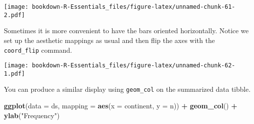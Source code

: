 \documentclass[
]{book}
\newenvironment{Shaded}{\begin{snugshade}}{\end{snugshade}}
\newcommand{\CommentTok}[1]{\textcolor[rgb]{0.56,0.35,0.01}{\textit{#1}}}
\newcommand{\DataTypeTok}[1]{\textcolor[rgb]{0.13,0.29,0.53}{#1}}
\newcommand{\DecValTok}[1]{\textcolor[rgb]{0.00,0.00,0.81}{#1}}
\newcommand{\KeywordTok}[1]{\textcolor[rgb]{0.13,0.29,0.53}{\textbf{#1}}}
\newcommand{\NormalTok}[1]{#1}
\newcommand{\OperatorTok}[1]{\textcolor[rgb]{0.81,0.36,0.00}{\textbf{#1}}}
\newcommand{\StringTok}[1]{\textcolor[rgb]{0.31,0.60,0.02}{#1}}
\begin{document}
\texttt{[image: bookdown-R-Essentials\_files/figure-latex/unnamed-chunk-61-2.pdf]}

Sometimes it is more convenient to have the bars oriented horizontally. Notice we set up the aesthetic mappings as usual and then flip the axes with the \texttt{coord\_flip} command.

\begin{Shaded}
\end{Shaded}

\texttt{[image: bookdown-R-Essentials\_files/figure-latex/unnamed-chunk-62-1.pdf]}

You can produce a similar display using \texttt{geom\_col} on the summarized data tibble.

\begin{Shaded}
\begin{Highlighting}[]
\KeywordTok{ggplot}\NormalTok{(}\DataTypeTok{data =}\NormalTok{ ds, }\DataTypeTok{mapping =} \KeywordTok{aes}\NormalTok{(}\DataTypeTok{x =}\NormalTok{ continent, }\DataTypeTok{y =}\NormalTok{ n)) }\OperatorTok{+}
\StringTok{  }\KeywordTok{geom_col}\NormalTok{() }\OperatorTok{+}
\StringTok{  }\KeywordTok{ylab}\NormalTok{(}\StringTok{"Frequency"}\NormalTok{)}
\end{Highlighting}
\end{Shaded}
\end{document}
